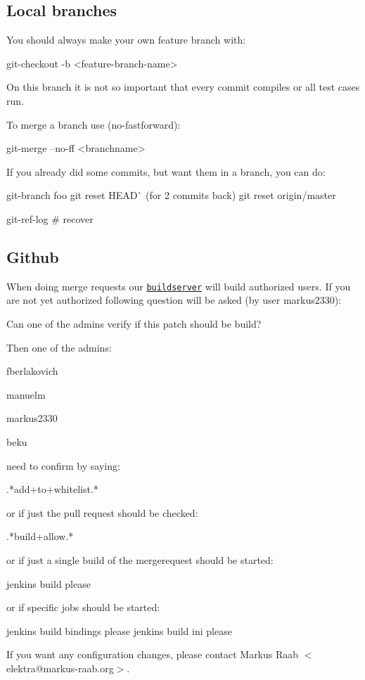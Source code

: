 \subsection*{Local branches}

You should always make your own feature branch with\+: \begin{DoxyVerb}    git-checkout -b <feature-branch-name>
\end{DoxyVerb}


On this branch it is not so important that every commit compiles or all test cases run.

To merge a branch use (no-\/fastforward)\+: \begin{DoxyVerb}    git-merge --no-ff <branchname>
\end{DoxyVerb}


If you already did some commits, but want them in a branch, you can do\+: \begin{DoxyVerb}    git-branch foo
    git reset HEAD^^  (for 2 commits back)
    git reset origin/master

    git-ref-log # recover
\end{DoxyVerb}


\subsection*{Github}

When doing merge requests our \href{http://build.libelektra.org:8080}{\tt buildserver} will build authorized users. If you are not yet authorized following question will be asked (by user markus2330)\+: \begin{DoxyVerb}    Can one of the admins verify if this patch should be build?
\end{DoxyVerb}


Then one of the admins\+:


\begin{DoxyItemize}
\item fberlakovich
\item manuelm
\item markus2330
\item beku
\end{DoxyItemize}

need to confirm by saying\+: \begin{DoxyVerb}    .*add\W+to\W+whitelist.*
\end{DoxyVerb}


or if just the pull request should be checked\+: \begin{DoxyVerb}    .*build\W+allow.*
\end{DoxyVerb}


or if just a single build of the mergerequest should be started\+: \begin{DoxyVerb}    jenkins build please
\end{DoxyVerb}


or if specific jobs should be started\+: \begin{DoxyVerb}    jenkins build bindings please
    jenkins build ini please
\end{DoxyVerb}


If you want any configuration changes, please contact {\ttfamily Markus Raab $<$elektra@markus-\/raab.\+org$>$}. 